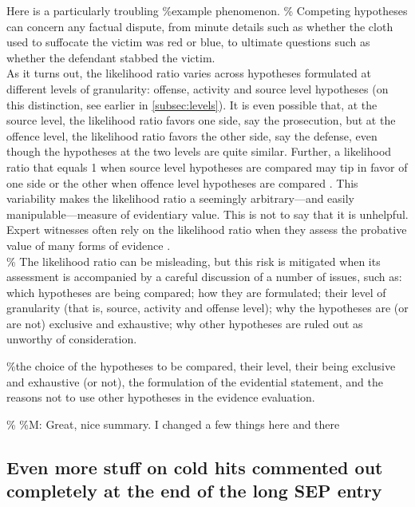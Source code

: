 \documentclass[10pt,dvipsnames,enabledeprecatedfontcommands]{scrartcl}
\begin{document}
Here is a particularly troubling \%example phenomenon.
\% Competing
hypotheses can concern any factual dispute, from minute details such as
whether the cloth used to suffocate the victim was red or blue, to
ultimate questions such as whether the defendant stabbed the victim.\\
As it turns out, the likelihood ratio varies across hypotheses
formulated at different levels of granularity: offense, activity and
source level hypotheses (on this distinction, see earlier in
\ref{subsec:levels}). It is even possible that, at the source level, the
likelihood ratio favors one side, say the prosecution, but at the
offence level, the likelihood ratio favors the other side, say the
defense, even though the hypotheses at the two levels are quite similar.
Further, a likelihood ratio that equals 1 when source level hypotheses
are compared may tip in favor of one side or the other when offence
level hypotheses are compared \citep{fenton2014WhenNeutralEvidence}.
This variability makes the likelihood ratio a seemingly arbitrary---and
easily manipulable---measure of evidentiary value. This is not to say
that it is unhelpful. Expert witnesses often rely on the likelihood
ratio when they assess the probative value of many forms of evidence
\citep{enfs2015}.\\
\% The likelihood ratio can be misleading, but this risk is mitigated
when its assessment is accompanied by a careful discussion of a number
of issues, such as: which hypotheses are being compared; how they are
formulated; their level of granularity (that is, source, activity and
offense level); why the hypotheses are (or are not) exclusive and
exhaustive; why other hypotheses are ruled out as unworthy of
consideration.

\%the choice of the hypotheses to be compared, their level, their being
exclusive and exhaustive (or not), the formulation of the evidential
statement, and the reasons not to use other hypotheses in the evidence
evaluation.

\% \%M: Great,
nice summary. I changed a few things here and there

\subsection{Even more stuff on cold hits commented out completely at the
end of the long SEP
entry}\label{even-more-stuff-on-cold-hits-commented-out-completely-at-the-end-of-the-long-sep-entry}
\end{document}
